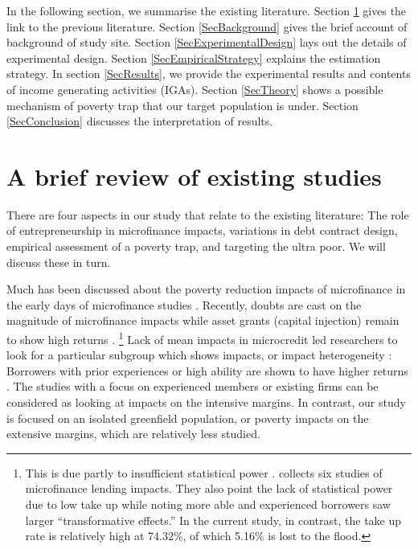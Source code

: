	In the following section, we summarise the existing literature. Section \ref{SecExistingStudies} gives the link to the previous literature. Section \ref{SecBackground} gives the brief account of background of study site. Section \ref{SecExperimentalDesign} lays out the details of experimental design. Section \ref{SecEmpiricalStrategy} explains the estimation strategy. In section \ref{SecResults}, we provide the experimental results and contents of income generating activities (IGAs). Section \ref{SecTheory} shows a possible mechanism of poverty trap that our target population is under. Section \ref{SecConclusion} discusses the interpretation of results.

\section{A brief review of existing studies}
\label{SecExistingStudies}

	There are four aspects in our study that relate to the existing literature: The role of entrepreneurship in microfinance impacts, variations in debt contract design, empirical assessment of a poverty trap, and targeting the ultra poor. We will discuss these in turn.

	Much has been discussed about the poverty reduction impacts of microfinance in the early days of microfinance studies \citep{PittKhandker1998, Morduch1999}. Recently, doubts are cast on the magnitude of microfinance impacts \citep{BanerjeeKarlanZinman2015, DuvendackMader2019, Meager2019} while asset grants (capital injection) remain to show high returns \citep{deMel2008, DeMel2014, FafchampsFlypaper2014, BandieraBRAC2017}. \footnote{This is due partly to insufficient statistical power \citep{MckenzieWoodruff2013}. \citet{BanerjeeKarlanZinman2015} collects six studies of microfinance lending impacts. They also point the lack of statistical power due to low take up while noting more able and experienced borrowers saw larger ``transformative effects.'' %
	In the current study, in contrast, the take up rate is relatively high at 74.32\%, of which 5.16\% is lost to the flood.  } Lack of mean impacts in microcredit led researchers to look for a particular subgroup which shows impacts, or impact heterogeneity \citep{Banerjee2017HyderabadFollowup}: Borrowers with prior experiences or high ability are shown to have higher returns \citep{Banerjee2015Miracle, Mckenzie2017Spurring, Buera2017, Banerjee2019MFPovertyTrap}. The studies with a focus on experienced members or existing firms can be considered as looking at impacts on the intensive margins. In contrast, our study is focused on an isolated greenfield population, or poverty impacts on the extensive margins, which are relatively less studied.

